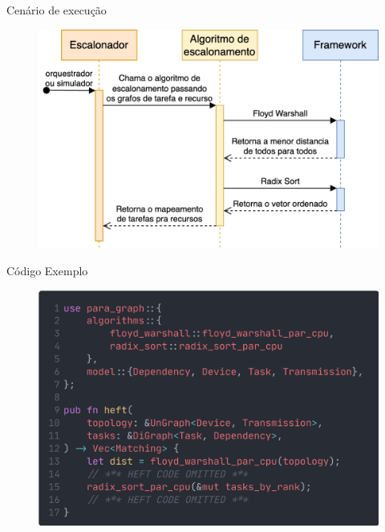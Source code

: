 \begin{frame}{Cenário de execução}
    \begin{figure}
        \centering
        \includegraphics[width=\textwidth]{Figuras/framework-usage-2.png}
    \end{figure}
\end{frame}

\begin{frame}{Código Exemplo}
    \begin{figure}
        \centering
        \includegraphics[width=\textwidth]{Figuras/code-2.png}
    \end{figure}
\end{frame}

